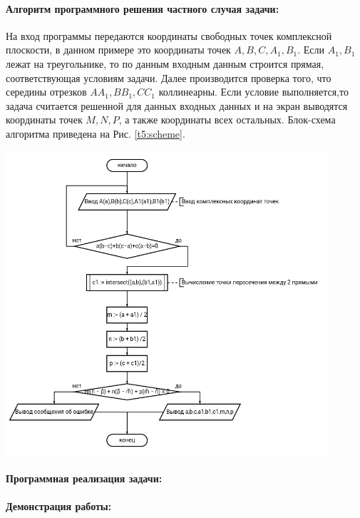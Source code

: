 {    \paragraph{Алгоритм программного решения частного случая задачи:}
    На вход программы передаются координаты свободных точек комплексной плоскости, в данном примере это координаты точек \(A,B,C,A_1,B_1\). Если \(A_1,B_1\) лежат на треугольнике, то по данным входным данным строится прямая, соответствующая условиям задачи. Далее производится проверка того, что середины отрезков \(AA_1,BB_1,CC_1\) коллинеарны. Если условие выполняется,то задача считается решенной для данных входных данных и на экран выводятся координаты точек \(M,N,P\), а также координаты всех остальных. Блок-схема алгоритма приведена на Рис. \ref{t5:scheme}.
    \begin{center}
        \includegraphics[width=0.9\textwidth]{images/diagram-1.png}
        \label{t5:scheme}
    \end{center}
    \paragraph{Программная реализация задачи:}
    \paragraph{Демонстрация работы:}
}
